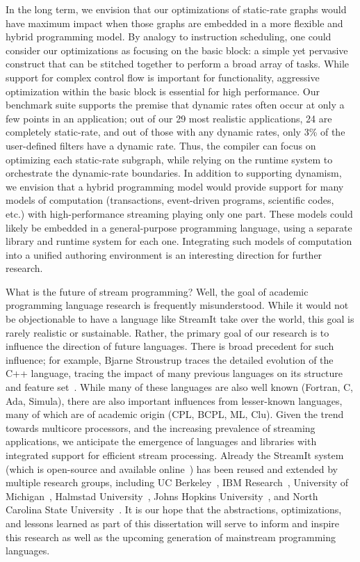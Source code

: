In the long term, we envision that our optimizations of static-rate
graphs would have maximum impact when those graphs are embedded in a
more flexible and hybrid programming model.  By analogy to instruction
scheduling, one could consider our optimizations as focusing on the
basic block: a simple yet pervasive construct that can be stitched
together to perform a broad array of tasks.  While support for complex
control flow is important for functionality, aggressive optimization
within the basic block is essential for high performance.  Our
benchmark suite supports the premise that dynamic rates often occur at
only a few points in an application; out of our 29 most realistic
applications, 24 are completely static-rate, and out of those with any
dynamic rates, only 3\% of the user-defined filters have a dynamic
rate.  Thus, the compiler can focus on optimizing each static-rate
subgraph, while relying on the runtime system to orchestrate the
dynamic-rate boundaries.  In addition to supporting dynamism, we
envision that a hybrid programming model would provide support for
many models of computation (transactions, event-driven programs,
scientific codes, etc.) with high-performance streaming playing only
one part.  These models could likely be embedded in a general-purpose
programming language, using a separate library and runtime system for
each one.  Integrating such models of computation into a unified
authoring environment is an interesting direction for further
research.

What is the future of stream programming?  Well, the goal of academic
programming language research is frequently misunderstood.  While it
would not be objectionable to have a language like StreamIt take over
the world, this goal is rarely realistic or sustainable.  Rather, the
primary goal of our research is to influence the direction of future
languages.  There is broad precedent for such influence; for example,
Bjarne Stroustrup traces the detailed evolution of the C++ language,
tracing the impact of many previous languages on its structure and
feature set~\cite{stroustrup_design_1994}.  While many of these
languages are also well known (Fortran, C, Ada, Simula), there are
also important influences from lesser-known languages, many of which
are of academic origin (CPL, BCPL, ML, Clu).  Given the trend towards
multicore processors, and the increasing prevalence of streaming
applications, we anticipate the emergence of languages and libraries
with integrated support for efficient stream processing.  Already the
StreamIt system (which is open-source and available
online~\cite{streamitweb}) has been reused and extended by multiple
research groups, including UC
Berkeley~\cite{mani-permutations,bit-streaming}, IBM
Research~\cite{huang_liquid_2008,hormati_optimus:_2008}, University of
Michigan~\cite{kudlur_orchestratingexecution_2008,hormati_optimus:_2008},
Halmstad University~\cite{ola-techrep,andersson_model_07}, Johns
Hopkins University~\cite{duca-thesis}, and North Carolina State
University~\cite{won-thesis}.  It is our hope that the abstractions,
optimizations, and lessons learned as part of this dissertation will
serve to inform and inspire this research as well as the upcoming
generation of mainstream programming languages.

